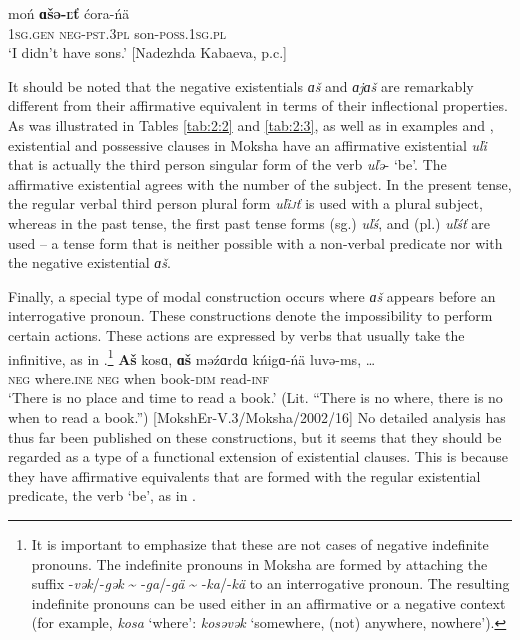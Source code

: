 \documentclass[output=paper,colorlinks,citecolor=brown,draft,draftmode]{langscibook}
\begin{document}
\ea\label{ex:moksha-no-sons-pst}
\gll moń \textbf{ɑšə-\textsc{ľ}ť} ćora-ńä\\
\textsc{1sg.gen}    \textsc{neg-pst.3pl}    son-\textsc{poss.1sg.pl}\\
\glt `I didn't have sons.' [Nadezhda Kabaeva, p.c.]
\z

  It should be noted that the negative existentials \textit{ɑš} and \textit{ɑjɑš} are remarkably different from their affirmative equivalent in terms of their inflectional properties. As was illustrated in Tables \ref{tab:2:2} and \ref{tab:2:3}, as well as in examples  and , existential and possessive clauses in Moksha have an affirmative existential \textit{uľi} that is actually the third person singular form of the verb \textit{uľə}- `be'. The affirmative existential agrees with the number of the subject. In the present tense, the regular verbal third person plural form \textit{uľi\textsc{j}ť} is used with a plural subject, whereas in the past tense, the first past tense forms (sg.) \textit{uľś}, and (pl.) \textit{uľśť} are used -- a tense form that is neither possible with a non-verbal predicate nor with the negative existential \textit{ɑš}.

  Finally, a special type of modal construction occurs where \textit{ɑš} appears before an interrogative pronoun. These constructions denote the impossibility to perform certain actions. These actions are expressed by verbs that usually take the infinitive, as in .\footnote{It is important to emphasize that these are not cases of negative indefinite pronouns. The indefinite pronouns in Moksha are formed by attaching the suffix -\textit{vək}/-\textit{gək} {\textasciitilde} -\textit{ga}/-\textit{gä} {\textasciitilde} -\textit{ka}/-\textit{kä} to an interrogative pronoun. The resulting indefinite pronouns can be used either in an affirmative or a negative context (for example, \textit{kosa} `where': \textit{kosəvək} `somewhere, (not) anywhere, nowhere').} 
\ea\label{ex:moksha-book}
\gll \textbf{Aš} kosɑ, \textbf{ɑš} məźɑrdɑ kńigɑ-ńä luvə-ms,
\ob\ldots\cb\\
\textsc{neg}  where.\textsc{ine}  \textsc{neg}  when      book-\textsc{dim}    read-\textsc{inf}\\
\glt `There is no place and time to read a book.' (Lit. ``There is no where, there is no when to read a book.'') [MokshEr-V.3/Moksha/2002/16]
\z
No detailed analysis has thus far been published on these constructions, but it seems that they should be regarded as a type of a functional extension of existential clauses. This is because they have affirmative equivalents that are formed with the regular existential predicate, the verb `be', as in .
\end{document}
